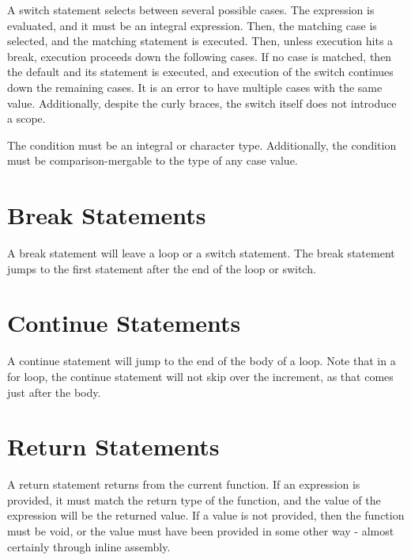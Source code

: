 \documentclass[letterpaper,12pt]{book}
\begin{document}


A switch statement selects between several possible cases. The expression is evaluated, and it must be an integral expression. Then, the matching case is selected, and the matching statement is executed. Then, unless execution hits a break, execution proceeds down the following cases. If no case is matched, then the default and its statement is executed, and execution of the switch continues down the remaining cases. It is an error to have multiple cases with the same value. Additionally, despite the curly braces, the switch itself does not introduce a scope.

The condition must be an integral or character type. Additionally, the condition must be comparison-mergable to the type of any case value.

\section{Break Statements}



A break statement will leave a loop or a switch statement. The break statement jumps to the first statement after the end of the loop or switch.

\section{Continue Statements}



A continue statement will jump to the end of the body of a loop. Note that in a for loop, the continue statement will not skip over the increment, as that comes just after the body.

\section{Return Statements}



A return statement returns from the current function. If an expression is provided, it must match the return type of the function, and the value of the expression will be the returned value. If a value is not provided, then the function must be void, or the value must have been provided in some other way - almost certainly through inline assembly.
\end{document}
